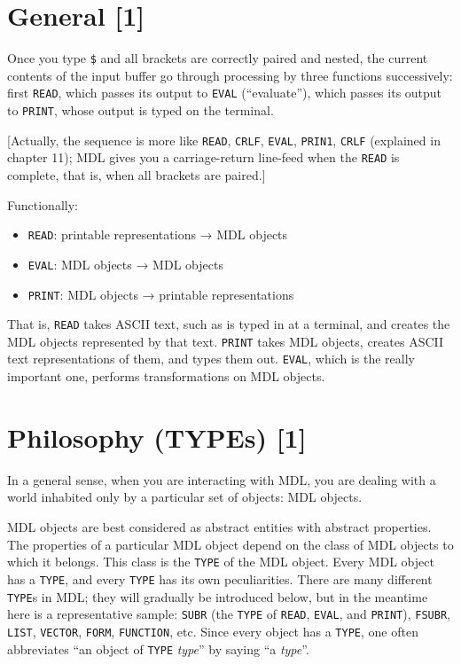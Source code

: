 \documentclass[a4paper]{scrbook}
\providecommand{\tightlist}{%
  \setlength{\itemsep}{0pt}\setlength{\parskip}{0pt}}
\begin{document}
\section{General {[}1{]}}\label{general-1}

Once you type \texttt{\$} and all brackets are correctly paired and nested, the current contents of the input buffer go
through processing by three functions successively: first \texttt{READ}, which passes its output to
\texttt{EVAL} (``evaluate''), which passes its output to
\texttt{PRINT}, whose output is typed on the terminal.

{[}Actually, the sequence is more like \texttt{READ}, \texttt{CRLF}, \texttt{EVAL}, \texttt{PRIN1}, \texttt{CRLF}
(explained in chapter 11); MDL gives you a carriage-return line-feed when the \texttt{READ} is complete, that is, when all
brackets are paired.{]}

Functionally:

\begin{itemize}
\tightlist
\item
  \texttt{READ}: printable representations → MDL objects
\item
  \texttt{EVAL}: MDL objects → MDL objects
\item
  \texttt{PRINT}: MDL objects → printable representations
\end{itemize}

That is, \texttt{READ} takes ASCII text, such as is typed in at a terminal, and creates the MDL objects represented by that
text. \texttt{PRINT} takes MDL objects, creates ASCII text representations of them, and types them out. \texttt{EVAL},
which is the really important one, performs transformations on MDL objects.

\section{Philosophy (TYPEs) {[}1{]}}\label{philosophy-types-1}

In a general sense, when you are interacting with MDL, you are dealing with a world inhabited only by a particular set of
objects: MDL objects.

MDL objects are best considered as abstract entities with abstract properties. The properties of a particular MDL object
depend on the class of MDL objects to which it belongs. This class is the \texttt{TYPE} of the
MDL object. Every MDL object has a \texttt{TYPE}, and every \texttt{TYPE} has its own peculiarities. There are many
different \texttt{TYPE}s in MDL; they will gradually be introduced below, but in the meantime here is a representative
sample: \texttt{SUBR} (the \texttt{TYPE} of \texttt{READ}, \texttt{EVAL}, and \texttt{PRINT}), \texttt{FSUBR},
\texttt{LIST}, \texttt{VECTOR}, \texttt{FORM}, \texttt{FUNCTION}, etc. Since every object has a \texttt{TYPE}, one often
abbreviates ``an object of \texttt{TYPE} \emph{type}'' by saying ``a \emph{type}''.
\end{document}
